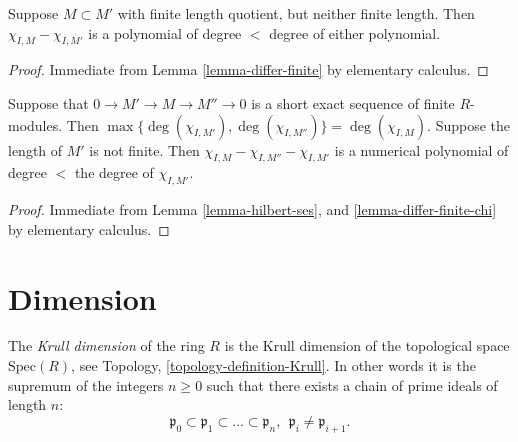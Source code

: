 \begin{lemma}
\label{lemma-differ-finite-chi}
Suppose $M \subset M'$ with finite length quotient,
but neither finite length.
Then $\chi_{I, M} - \chi_{I, M'}$
is a polynomial of degree $<$ degree of either
polynomial.
\end{lemma}

\begin{proof}
Immediate from Lemma \ref{lemma-differ-finite} by elementary calculus.
\end{proof}

\begin{lemma}
\label{lemma-hilbert-ses-chi}
Suppose that $0 \to M' \to M \to M'' \to 0$
is a short exact sequence of finite $R$-modules.
Then $\max\{ \deg(\chi_{I, M'}), \deg(\chi_{I, M''}) \}
= \deg(\chi_{I, M})$.
Suppose the length of $M'$ is not finite.
Then $\chi_{I, M} - \chi_{I, M''} - \chi_{I, M'}$
is a numerical polynomial of degree $<$ the degree of
$\chi_{I, M'}$.
\end{lemma}

\begin{proof}
Immediate from Lemma \ref{lemma-hilbert-ses}, and
\ref{lemma-differ-finite-chi} by elementary calculus.
\end{proof}



































\section{Dimension}
\label{section-dimension}

\begin{definition}
\label{definition-Krull}
The {\it Krull dimension} of the ring $R$ is the
Krull dimension of the topological space $\text{Spec}(R)$,
see Topology, \ref{topology-definition-Krull}.
In other words it is the supremum of the integers $n\geq 0$
such that there exists a chain of prime ideals of length $n$:
$$
\mathfrak p_0
\subset
\mathfrak p_1
\subset
\ldots
\subset
\mathfrak p_n, \ \ 
\mathfrak p_i \not= \mathfrak p_{i + 1}.
$$
\end{definition}

